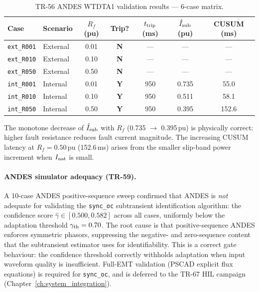 \begin{table}[h]
  \centering
  \caption{TR-56 ANDES WTDTA1 validation results — 6-case matrix.}
  \label{tab:ch6_dfig_andes}
  \begin{tabular}{llccccc}
    \toprule
    Case & Scenario & $R_f$ (pu) & Trip? & $t_{\rm trip}$ (ms) &
          $\hat{I}_{\rm sub}$ (pu) & CUSUM (ms) \\
    \midrule
    \texttt{ext\_R001} & External & 0.01 & \textbf{N} & --- & ---   & ---   \\
    \texttt{ext\_R010} & External & 0.10 & \textbf{N} & --- & ---   & ---   \\
    \texttt{ext\_R050} & External & 0.50 & \textbf{N} & --- & ---   & ---   \\
    \texttt{int\_R001} & Internal & 0.01 & \textbf{Y} & 950 & 0.735 & 55.0  \\
    \texttt{int\_R010} & Internal & 0.10 & \textbf{Y} & 950 & 0.511 & 58.1  \\
    \texttt{int\_R050} & Internal & 0.50 & \textbf{Y} & 950 & 0.395 & 152.6 \\
    \bottomrule
  \end{tabular}
\end{table}

\noindent
The monotone decrease of $\hat{I}_{\rm sub}$ with $R_f$ (0.735 $\to$ 0.395\,pu)
is physically correct: higher fault resistance reduces fault current magnitude.
The increasing CUSUM latency at $R_f = 0.50\,\text{pu}$ (152.6\,ms) arises
from the smaller slip-band power increment when $I_{\rm nat}$ is small.

\paragraph{ANDES simulator adequacy (TR-59).}
A 10-case ANDES positive-sequence sweep confirmed that ANDES is
\emph{not} adequate for validating the \texttt{sync\_oc} subtransient
identification algorithm: the confidence score $\hat{\gamma} \in [0.500, 0.582]$
across all cases, uniformly below the adaptation threshold $\gamma_{\rm th} = 0.70$.
The root cause is that positive-sequence ANDES enforces symmetric phasors,
suppressing the negative- and zero-sequence content that the subtransient
estimator uses for identifiability.
This is a correct gate behaviour: the confidence threshold correctly withholds
adaptation when input waveform quality is insufficient.
Full-EMT validation (PSCAD explicit flux equations) is required for
\texttt{sync\_oc}, and is deferred to the TR-67 HIL campaign
(Chapter~\ref{ch:system_integration}).

